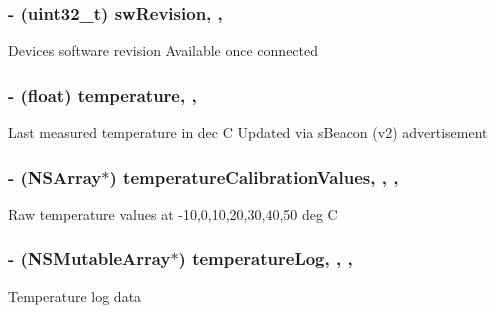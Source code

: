 \subsubsection[{sw\+Revision}]{\setlength{\rightskip}{0pt plus 5cm}-\/ (uint32\+\_\+t) sw\+Revision\hspace{0.3cm}{\ttfamily [read]}, {\ttfamily [nonatomic]}, {\ttfamily [assign]}}\label{interface_le_snf_device_a87d28e38945f818bc093da48ecdbb182}
Device\textquotesingle{}s software revision Available once connected \hypertarget{interface_le_snf_device_a8bb8a1bce35bd386ac909c35215a4b8a}{}
\subsubsection[{temperature}]{\setlength{\rightskip}{0pt plus 5cm}-\/ (float) temperature\hspace{0.3cm}{\ttfamily [read]}, {\ttfamily [nonatomic]}, {\ttfamily [assign]}}\label{interface_le_snf_device_a8bb8a1bce35bd386ac909c35215a4b8a}
Last measured temperature in dec C Updated via s\+Beacon (v2) advertisement \hypertarget{interface_le_snf_device_a06108c7aecbfe26a075ce43fa010333f}{}
\subsubsection[{temperature\+Calibration\+Values}]{\setlength{\rightskip}{0pt plus 5cm}-\/ (N\+S\+Array$\ast$) temperature\+Calibration\+Values\hspace{0.3cm}{\ttfamily [read]}, {\ttfamily [write]}, {\ttfamily [nonatomic]}, {\ttfamily [assign]}}\label{interface_le_snf_device_a06108c7aecbfe26a075ce43fa010333f}
Raw temperature values at -\/10,0,10,20,30,40,50 deg C \hypertarget{interface_le_snf_device_a0e3007ac5be7500511a19704b7223af2}{}
\subsubsection[{temperature\+Log}]{\setlength{\rightskip}{0pt plus 5cm}-\/ (N\+S\+Mutable\+Array$\ast$) temperature\+Log\hspace{0.3cm}{\ttfamily [read]}, {\ttfamily [write]}, {\ttfamily [nonatomic]}, {\ttfamily [strong]}}\label{interface_le_snf_device_a0e3007ac5be7500511a19704b7223af2}
Temperature log data \hypertarget{interface_le_snf_device_a8cdcdf37d487556008e5421dc353ac3a}{}
